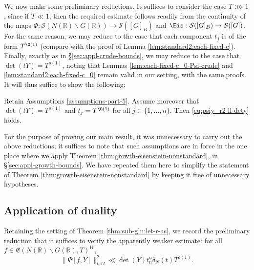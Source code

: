 We now make some preliminary reductions.  It suffices to consider the case $T \ggg 1$, since if $T \ll 1$, then the required estimate follows readily from the continuity of the maps $\Phi : \mathcal{S}(N(\mathbb{R}) \backslash G(\mathbb{R})) \rightarrow \mathcal{S}([G]_B)$ and $\Eis : \mathcal{S}([G]_B) \rightarrow \mathcal{S}([G])$.  For the same reason, we may reduce to the case that each component $t_j$ is of the form $T^{\O(1)}$ (compare with the proof of Lemma \ref{lem:standard2:each-fixed-c}).  Finally, exactly as in \S\ref{sec:appl-crude-bounds}, we may reduce to the case that $\det(t Y) = T^{o(1)}$, noting that Lemmas \ref{lem:each-fixed-c_0-Psi-crude} and \ref{lem:standard2:each-fixed-c_0} remain valid in our setting, with the same proofs.  It will thus suffice to show the following:
\begin{theorem}\label{thm:sub-gln:let-r-as}
  Retain Assumptions \ref{assumptions-part-5}.  Assume moreover that $\det(t Y) = T^{o(1)}$ and $t_j = T^{\O(1)}$ for all $j \in \{1, \dotsc, n\}$.  Then
  \eqref{eq:psiy_r2-ll-dety} holds.
\end{theorem}

\begin{remark}
  For the purpose of proving our main result, it was unnecessary to carry out the above reductions; it suffices to note that such assumptions are in force in the one place where we apply Theorem \ref{thm:growth-eisenstein-nonstandard}, in \S\ref{sec:appl-growth-bounds}.  We have repeated them here to simplify the statement of Theorem \ref{thm:growth-eisenstein-nonstandard} by keeping it free of unnecessary hypotheses.
\end{remark}

\subsection{Application of duality}\label{sec:cq2z5f8a4z}
Retaining the setting of Theorem \ref{thm:sub-gln:let-r-as}, we record the preliminary reduction that it suffices to verify the apparently weaker estimate: for all $f \in  \mathfrak{E}(N(\mathbb{R}) \backslash G(\mathbb{R}), T)^W$,
\begin{equation}\label{eq:psiy_r2-ll-dety-1}
  \|\Psi[f,Y]\|_{t,\Omega}^2 \ll
  \det(Y)
  t_n^n \delta_N(t) T^{o(1)}.
\end{equation}

